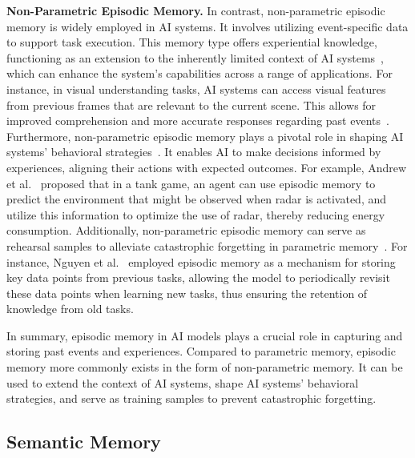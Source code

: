 \documentclass[journal,hideappendix]{vgtc}
\newenvironment{j_itemize}{
\begin{itemize}[]
  \setlength{\itemsep}{3pt}
  \setlength{\parskip}{0pt}
  \setlength{\parsep}{0pt}
}{\end{itemize}}
\begin{document}
\begin{j_itemize}
    \item[$\bullet$] \textbf{Non-Parametric Episodic Memory.} In contrast, non-parametric episodic memory is widely employed in AI systems. It involves utilizing event-specific data to support task execution. This memory type offers experiential knowledge, functioning as an extension to the inherently limited context of AI systems~\cite{andrew2007episodic,das2024larimar,fountas2024human}, which can enhance the system's capabilities across a range of applications. 
    For instance, in visual understanding tasks, AI systems can access visual features from previous frames that are relevant to the current scene. This allows for improved comprehension and more accurate responses regarding past events~\cite{mezghan2022memory,cheng2022xmem,song2023moviechat,shen2023encode,jilan2024egoInstructor,he2024ma}. 
    Furthermore, non-parametric episodic memory plays a pivotal role in shaping AI systems' behavioral strategies~\cite{vere1990basic,ho2003comparing,andrew2007episodic,roscow2021learning,shinn2024reflexion}. It enables AI to make decisions informed by experiences, aligning their actions with expected outcomes. For example, Andrew et al.~\cite{andrew2007episodic} proposed that in a tank game, an agent can use episodic memory to predict the environment that might be observed when radar is activated, and utilize this information to optimize the use of radar, thereby reducing energy consumption. Additionally, non-parametric episodic memory can serve as rehearsal samples to alleviate catastrophic forgetting in parametric memory~\cite{lopez2017gradient,nguyen2018variational,de2019episodic}. For instance, Nguyen et al.~\cite{nguyen2018variational} employed episodic memory as a mechanism for storing key data points from previous tasks, allowing the model to periodically revisit these data points when learning new tasks, thus ensuring the retention of knowledge from old tasks.

\end{j_itemize}

In summary, episodic memory in AI models plays a crucial role in capturing and storing past events and experiences. Compared to parametric memory, episodic memory more commonly exists in the form of non-parametric memory. It can be used to extend the context of AI systems, shape AI systems' behavioral strategies, and serve as training samples to prevent catastrophic forgetting.

\subsection{Semantic Memory}
\label{sec:hierarchy_ai_memory:semantic}
\end{document}
